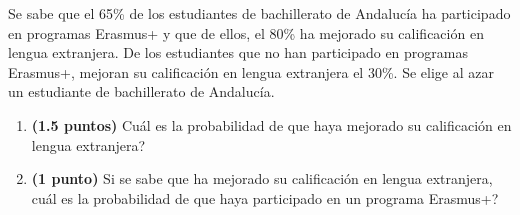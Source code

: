 
Se sabe que el 65\% de los estudiantes de bachillerato de Andalucía ha participado en programas Erasmus+ y que de ellos, el 80\% ha mejorado su calificación en lengua extranjera. De los estudiantes que no han participado en programas Erasmus+, mejoran su calificación en lengua extranjera el 30\%. Se elige al azar un estudiante de bachillerato de Andalucía.
\begin{enumerate}[label=\alph*)]
\item \textbf{(1.5 puntos)} \textquestiondown{}Cuál es la probabilidad de que haya mejorado su calificación en lengua extranjera?
\item \textbf{(1 punto)} Si se sabe que ha mejorado su calificación en lengua extranjera, \textquestiondown{}cuál es la probabilidad de que haya participado en un programa Erasmus+?
\end{enumerate}

